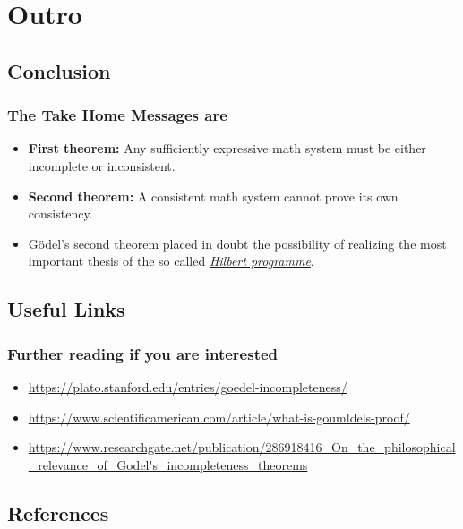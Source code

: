 \documentclass[aspectratio=169]{beamer}
\begin{document}
\section{Outro}
\subsection{Conclusion}
\begin{frame}
	\frametitle{The Take Home Messages are}
	\begin{itemize}
		\item \textbf{First theorem:} Any sufficiently expressive math system must be either incomplete or inconsistent.
		\item \textbf{Second theorem:} A consistent math system cannot prove its own consistency.
		\item Gödel's second theorem placed in doubt the possibility of realizing the most important thesis of the so called \href{https://en.wikipedia.org/wiki/Hilbert\%27s_problems}{\textit{Hilbert programme}}. \cite{bekl}
	\end{itemize}
\end{frame}

\subsection{Useful Links}
\begin{frame}
	\frametitle{Further reading if you are interested}
	\begin{itemize}
		\item \url{https://plato.stanford.edu/entries/goedel-incompleteness/}
		\item \url{https://www.scientificamerican.com/article/what-is-goumldels-proof/}
		\item \url{https://www.researchgate.net/publication/286918416_On_the_philosophical_relevance_of_Godel's_incompleteness_theorems}
	\end{itemize}
\end{frame}

\subsection{References}
\begin{frame}
    
    
\end{frame}
\end{document}
